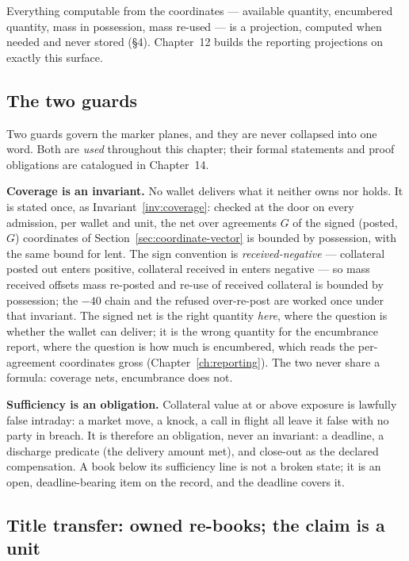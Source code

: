 Everything computable from the coordinates --- available quantity, encumbered
quantity, mass in possession, mass re-used --- is a projection, computed when
needed and never stored (\S4). Chapter~12 builds the reporting projections on
exactly this surface.

\subsection{The two guards}

Two guards govern the marker planes, and they are never collapsed into one
word. Both are \emph{used} throughout this chapter; their formal statements and
proof obligations are catalogued in Chapter~14.

\textbf{Coverage is an invariant.} No wallet delivers what it neither owns nor
holds. It is stated once, as Invariant~\ref{inv:coverage}: checked at the door on
every admission, per wallet and unit, the net over agreements $G$ of the signed
(posted, $G$) coordinates of Section~\ref{sec:coordinate-vector} is bounded by
possession, with the same bound for lent. The sign convention is
\emph{received-negative} --- collateral posted out enters positive, collateral
received in enters negative --- so mass received offsets mass re-posted and re-use
of received collateral is bounded by possession; the $-40$ chain and the refused
over-re-post are worked once under that invariant. The signed net is the right
quantity \emph{here}, where the question is whether the wallet can deliver; it is
the wrong quantity for the encumbrance report, where the question is how much is
encumbered, which reads the per-agreement coordinates gross
(Chapter~\ref{ch:reporting}). The two never share a formula: coverage nets,
encumbrance does not.

\textbf{Sufficiency is an obligation.} Collateral value at or above exposure
is lawfully false intraday: a market move, a knock, a call in flight all leave
it false with no party in breach. It is therefore an obligation, never an
invariant: a deadline, a discharge predicate (the delivery amount met), and
close-out as the declared compensation. A book below its sufficiency line is
not a broken state; it is an open, deadline-bearing item on the record, and
the deadline covers it.

\subsection{Title transfer: owned re-books; the claim is a unit}


